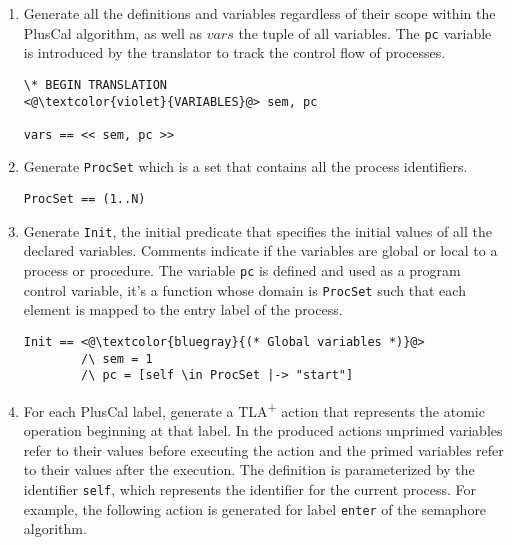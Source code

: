 \documentclass{article}
\newcommand{\tlaplus}{TLA\textsuperscript{+}\xspace}
\begin{document}
\begin{enumerate}
\item Generate all the definitions and variables regardless of their scope within the PlusCal algorithm, as well as $vars$ the tuple of all variables.
The \verb|pc| variable is introduced by the translator to track the control flow of processes.

\FloatBarrier
\begin{lstlisting}[language=pluscal, frame = tlrb, numbers = none]
\* BEGIN TRANSLATION
<@\textcolor{violet}{VARIABLES}@> sem, pc

vars == << sem, pc >>

\end{lstlisting}

\item Generate \verb|ProcSet| which is a set that contains all the process identifiers.

\begin{lstlisting}[language=pluscal, frame = tlrb, numbers=none]
ProcSet == (1..N)

\end{lstlisting}

\item  Generate \verb|Init|, the initial predicate that specifies the initial values of all the declared variables. Comments indicate if the variables are global or local to a process or procedure.
The variable \verb|pc| is defined and used as a program control variable, it's a function whose domain is \verb|ProcSet| such that each element is mapped to the entry label of the process.

\begin{lstlisting}[language=pluscal, frame = tlrb, numbers=none]
Init == <@\textcolor{bluegray}{(* Global variables *)}@> 
        /\ sem = 1
        /\ pc = [self \in ProcSet |-> "start"]

\end{lstlisting}

\item For each PlusCal label, generate a \tlaplus action that represents the atomic operation beginning at that label. 
In the produced actions unprimed variables refer to their values before executing the action and the primed variables refer to their values after the execution.
The definition is parameterized by the identifier \verb|self|,
which represents the identifier for the current process. For example, the following action is generated for label \texttt{enter} of the semaphore algorithm.


\end{enumerate}
\end{document}
